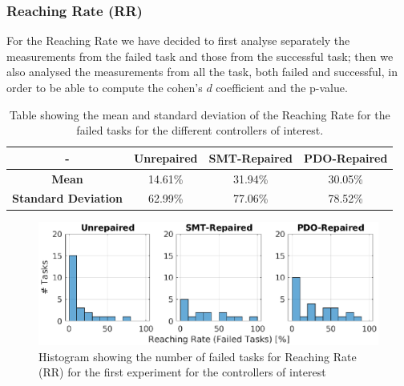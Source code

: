\subsubsection{Reaching Rate (RR)}\label{subsub:first-RR}
For the Reaching Rate we have decided to first analyse separately the measurements from the failed task and those from the successful task; then we also analysed the measurements from all the task, both failed and successful, in order to be able to compute the cohen's $d$ coefficient and the p-value.\\
%
%
\begin{table}[H]
    \centering
    \begin{tabular}{|c|c|c|c|}
        \hline
        - & \textbf{Unrepaired} & \textbf{SMT-Repaired} & \textbf{PDO-Repaired} \\
        \hline
        \textbf{Mean} & 14.61\% & 31.94\% & 30.05\% \\
        \textbf{Standard Deviation} & 62.99\% & 77.06\% & 78.52\% \\
        \hline
    \end{tabular}
    \caption{Table showing the mean and standard deviation of the Reaching Rate for the failed tasks for the different controllers of interest.}
    \label{tab:RR-fail-first-mean-std}
\end{table}
\begin{figure}[H]
    \centering
    \includegraphics[width=\textwidth]{Images/first-experiment/exp0_RR_fail_hist.eps}
    \caption{Histogram showing the number of failed tasks for Reaching Rate (RR) for the first experiment for the controllers of interest}
    \label{fig:hist-RR-fail-first}
\end{figure}
